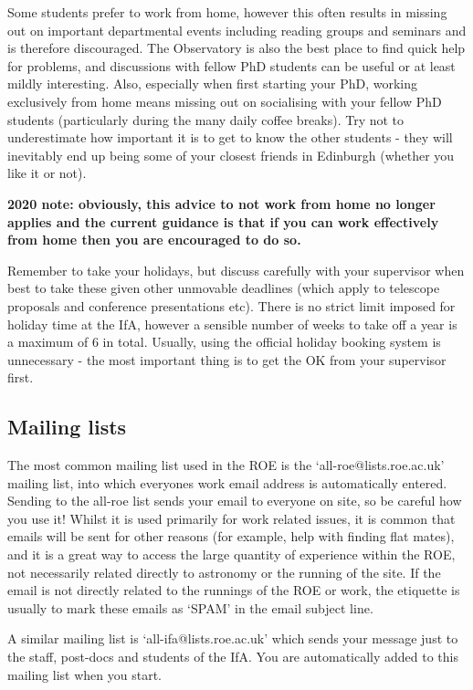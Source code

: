 Some students prefer to work from home, however this often results in missing out on important departmental events including reading groups and seminars and is therefore discouraged. The Observatory is also the best place to find quick help for problems, and discussions with fellow PhD students can be useful or at least mildly interesting.  Also, especially when first starting your PhD, working exclusively from home means missing out on socialising with your fellow PhD students (particularly during the many daily coffee breaks). Try not to underestimate how important it is to get to know the other students - they will inevitably end up being some of your closest friends in Edinburgh (whether you like it or not). 

{\bf 2020 note: obviously, this advice to not work from home no longer applies and the current guidance is that if you can work effectively from home then you are encouraged to do so.}

Remember to take your holidays, but discuss carefully with your supervisor when best to take these given other unmovable deadlines (which apply to telescope proposals and conference presentations etc). There is no strict limit imposed for holiday time at the IfA, however a sensible number of weeks to take off a year is a maximum of 6 in total. Usually, using the official holiday booking system is unnecessary - the most important thing is to get the OK from your supervisor first. 

\subsection{Mailing lists}

The most common mailing list used in the ROE is the `all-roe@lists.roe.ac.uk' mailing list, into which
everyones work email address is automatically entered. Sending to
the all-roe list sends your email to everyone on site, so be careful how you use it! Whilst
it is used primarily for work related issues, it is common that emails will be sent for other
 reasons (for example, help with finding flat mates), 
and it is a great way to access the large quantity of experience within
the ROE, not necessarily related directly to astronomy or the running of the site. If the email is
not directly related to the runnings of the ROE or work, the etiquette is usually to mark
these emails as `SPAM' in the email subject line.

A similar mailing list is `all-ifa@lists.roe.ac.uk' which sends your message just to the staff, post-docs
and students of the IfA. You are automatically added to this mailing list when you start.

